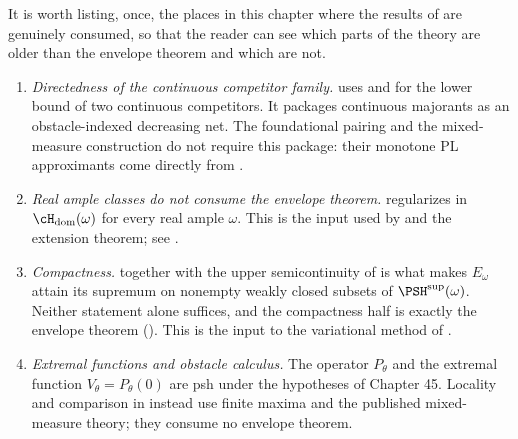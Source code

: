 It is worth listing, once, the places in this chapter where the results of
 are genuinely consumed, so that the
reader can see which parts of the theory are older than the envelope
theorem and which are not.

\begin{enumerate}
\item\label{itm:ch46-env:directed}
      \emph{Directedness of the continuous competitor family.}
       uses
       and
       for the lower bound of two
      continuous competitors. It packages continuous majorants as an
      obstacle-indexed decreasing net.  The foundational pairing and the
      mixed-measure construction do not require this package: their
      monotone PL approximants come directly from
      .
\item\label{itm:ch46-env:real}
      \emph{Real ample classes do not consume the envelope theorem.}
       regularizes in
      $\cH_{\mathrm{dom}}(\omega)$ for every real ample $\omega$.
      This is the input used by  and the
      extension theorem; see .
\item\label{itm:ch46-env:compactness}
      \emph{Compactness.}   together with the
      upper semicontinuity of  is what makes
      $E_\omega$ attain its supremum on nonempty weakly closed subsets of
      $\PSH^{\sup}(\omega)$.  Neither statement alone suffices, and the
      compactness half is exactly the envelope theorem
      ().  This is the input to the
      variational method of .
\item\label{itm:ch46-env:obstacles}
      \emph{Extremal functions and obstacle calculus.} The operator
      $P_\theta$ and the extremal function $V_\theta=P_\theta(0)$
      are psh under the hypotheses of Chapter 45.
      Locality and comparison in  instead use finite
      maxima and the published mixed-measure theory; they consume no
      envelope theorem.
\end{enumerate}

